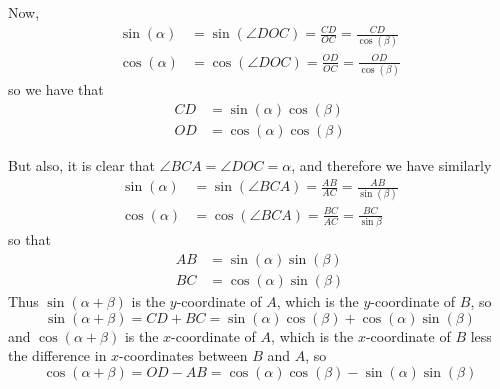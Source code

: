 \documentclass[12pt]{article}
\begin{document}
Now,
\begin{align*}
\sin(\alpha)&=\sin(\angle DOC)=\frac{CD}{OC}=\frac{CD}{\cos(\beta)}\\
\cos(\alpha)&=\cos(\angle DOC)=\frac{OD}{OC}=\frac{OD}{\cos(\beta)}
\end{align*}
so we have that
\begin{align*}
CD&=\sin(\alpha)\cos(\beta)\\
OD&=\cos(\alpha)\cos(\beta)
\end{align*}

But also, it is clear that $\angle BCA=\angle DOC=\alpha$, and therefore we have similarly
\begin{align*}
\sin(\alpha)&=\sin(\angle BCA)=\frac{AB}{AC}=\frac{AB}{\sin(\beta)}\\
\cos(\alpha)&=\cos(\angle BCA)=\frac{BC}{AC}=\frac{BC}{\sin\beta}
\end{align*}
so that
\begin{align*}
AB&=\sin(\alpha)\sin(\beta)\\
BC&=\cos(\alpha)\sin(\beta)
\end{align*}
Thus $\sin(\alpha+\beta)$ is the $y$-coordinate of $A$, which is the $y$-coordinate of $B$, so
\[\sin(\alpha+\beta)=CD+BC=\sin(\alpha)\cos(\beta)+\cos(\alpha)\sin(\beta)\]
and $\cos(\alpha+\beta)$ is the $x$-coordinate of $A$, which is the $x$-coordinate of $B$ less the difference in $x$-coordinates between $B$ and $A$, so
\[\cos(\alpha+\beta)=OD-AB=\cos(\alpha)\cos(\beta)-\sin(\alpha)\sin(\beta)\]
\end{document}
